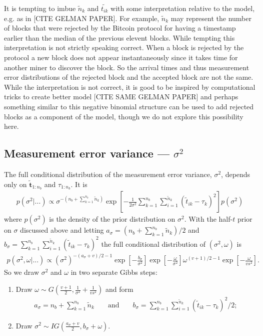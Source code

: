 \documentclass{article}
\begin{document}
It is tempting to imbue $\tilde{n}_k$ and $\tilde{t_{ik}}$ with some interpretation relative to the model, e.g. as in [CITE GELMAN PAPER]. For example, $\tilde{n}_k$ may represent the number of blocks that were rejected by the Bitcoin protocol for having a timestamp earlier than the median of the previous elevent blocks. While tempting this interpretation is not strictly speaking correct. When a block is rejected by the protocol a new block does not appear instantaneously since it takes time for another miner to discover the block. So the arrival times and thus measurement error distributions of the rejected block and the accepted block are not the same. While the interpretation is not correct, it is good to be inspired by computational tricks to create better model [CITE SAME GELMAN PAPER] and perhaps something similar to this negative binomial structure can be used to add rejected blocks as a component of the model, though we do not explore this possibility here.

\subsection{Measurement error variance --- $\sigma^2$}
The full conditional distribution of the measurement error variance, $\sigma^2$, depends only on $\tilde{\bm{t}}_{1:n_{b}}$ and $\tau_{1:n_{b}}$. It is
\begin{align*}
p(\sigma^2|...) \propto \sigma^{-(n_{b} + \sum_{k=1}^{n_{b}}\tilde{n}_k)}\exp\left[-\frac{1}{2\sigma^2}\sum_{k=1}^{n_{b}}\sum_{i=1}^{\tilde{n}_k}(\tilde{t}_{ik} - \tau_k)^2\right]p(\sigma^2)
\end{align*}
where $p(\sigma^2)$ is the density of the prior distribution on $\sigma^2$. With the half-$t$ prior on $\sigma$ discussed above and letting $a_\sigma = (n_{b} + \sum_{k=1}^{n_b}\tilde{n}_k)/2$ and $b_\sigma = \sum_{k=1}^{n_{b}}\sum_{i=1}^{\tilde{n}_k}(\tilde{t}_{ik} - \tau_k)^2$ the full conditional distribution of $(\sigma^2,\omega)$ is
\begin{align*}
p(\sigma^2,\omega|...) \propto (\sigma^2)^{-(a_\sigma+v)/2-1}\exp\left[-\frac{b_\sigma}{\sigma^2}\right]\exp\left[-\frac{\omega}{\sigma^2}\right]\omega^{(v + 1)/2 - 1}\exp\left[-\frac{\omega}{v s^2}\right].
\end{align*}
So we draw $\sigma^2$ and $\omega$ in two separate Gibbs steps:
\begin{enumerate}
\item Draw $\omega \sim G\left(\frac{v + 1}{2}, \frac{1}{\sigma^2} + \frac{1}{v s^2}\right)$ and form
\begin{align*}
a_\sigma = n_{b} + \sum_{k=1}^{n_b}\tilde{n}_k &&\mbox{  and  }&& b_\sigma = \sum_{k=1}^{n_{b}}\sum_{i=1}^{\tilde{n}_k}(\tilde{t}_{ik} - \tau_k)^2/2;
\end{align*}
\item Draw $\sigma^2 \sim  IG\left(\frac{a_\sigma + v}{2}, b_\sigma + \omega\right)$.
\end{enumerate}
\end{document}
